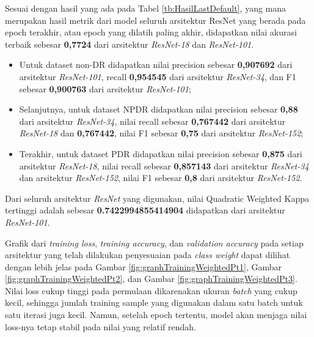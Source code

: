 Sesuai dengan hasil yang ada pada Tabel \ref{tb:HasilLastDefault}, yang mana merupakan hasil metrik dari model seluruh arsitektur ResNet yang berada pada epoch terakhir, atau epoch yang dilatih paling akhir, didapatkan nilai akurasi terbaik sebesar \textbf{0,7724} dari arsitektur \emph{ResNet-18} dan \emph{ResNet-101}.

\begin{itemize}
	
	\item Untuk dataset non-DR didapatkan nilai precision sebesar \textbf{0,907692} dari arsitektur \emph{ResNet-101}, recall \textbf{0,954545} dari arsitektur \emph{ResNet-34}, dan F1 sebesar \textbf{0,900763} dari arsitektur \emph{ResNet-101};
	
	\item Selanjutnya, untuk dataset NPDR didapatkan nilai precision sebesar \textbf{0,88} dari arsitektur \emph{ResNet-34}, nilai recall sebesar \textbf{0,767442} dari arsitektur \emph{ResNet-18} dan \textbf{0,767442}, nilai F1 sebesar \textbf{0,75} dari arsitektur \emph{ResNet-152};
	
	\item Terakhir, untuk dataset PDR didapatkan nilai precision sebesar \textbf{0,875} dari arsitektur \emph{ResNet-18}, nilai recall sebesar \textbf{0,857143} dari arsitektur \emph{ResNet-34} dan arsitektur \emph{ResNet-152}, nilai F1 sebesar \textbf{0,8} dari arsitektur \emph{ResNet-152}.
	
\end{itemize}

Dari seluruh arsitektur \emph{ResNet} yang digunakan, nilai Quadratic Weighted Kappa tertinggi adalah sebesar \textbf{0.7422994855414904} didapatkan dari arsitektur \emph{ResNet-101}.

Grafik dari \emph{training loss}, \emph{training accuracy}, dan \emph{validation accuracy} pada setiap arsitektur yang telah dilakukan penyesuaian pada \emph{class weight} dapat dilihat dengan lebih jelas pada Gambar \ref{fig:graphTrainingWeightedPt1}, Gambar \ref{fig:graphTrainingWeightedPt2}, dan Gambar \ref{fig:graphTrainingWeightedPt3}. Nilai loss cukup tinggi pada permulaan dikarenakan ukuran \emph{batch} yang cukup kecil, sehingga jumlah training sample yang digunakan dalam satu batch untuk satu iterasi juga kecil. Namun, setelah epoch tertentu, model akan menjaga nilai loss-nya tetap stabil pada nilai yang relatif rendah.
\pagebreak

